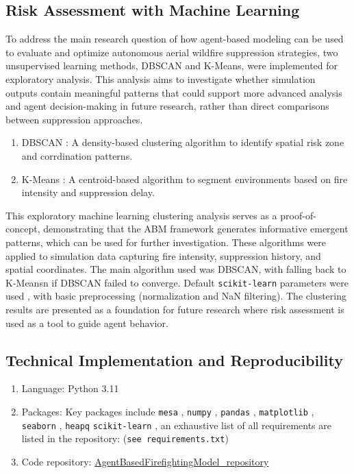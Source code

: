 \documentclass[11pt, a4paper]{article}
\begin{document}
\subsection{Risk Assessment with Machine Learning}

To address the main research question of how agent-based modeling can be used to evaluate and optimize autonomous aerial wildfire suppression strategies, two unsupervised learning methods, DBSCAN and K-Means, were implemented for exploratory analysis. This analysis aims to investigate whether simulation outputs contain meaningful patterns that could support more advanced analysis and agent decision-making in future research, rather than direct comparisons between suppression approaches.
\begin{enumerate}
    \item DBSCAN \citep{dbscan}: A density-based clustering algorithm to identify spatial risk zone and corrdination patterns.
    \item K-Means \citep{kmeans}: A centroid-based algorithm to segment environments based on fire intensity and suppression delay.
\end{enumerate}

This exploratory machine learning clustering analysis serves as a proof-of-concept, demonstrating that the ABM framework generates informative emergent patterns, which can be used for further investigation. These algorithms were applied to simulation data capturing fire intensity, suppression history, and spatial coordinates. The main algorithm used was DBSCAN, with falling back to K-Meansn if DBSCAN failed to converge. Default \texttt{scikit-learn} parameters were used \citep{scikit-learn}, with basic preprocessing (normalization and NaN filtering). The clustering results are presented as a foundation for future research where risk assessment is used as a tool to guide agent behavior. 

\subsection{Technical Implementation and Reproducibility}
\begin{enumerate}
    \item Language: Python 3.11 \citep{python3.11}
    \item Packages: Key packages include \texttt{mesa} \citep{terMesa}, \texttt{numpy} \citep{numpy}, \texttt{pandas} \citep{reback2020pandas}, \texttt{matplotlib} \citep{Matplotlib}, \texttt{seaborn} \citep{seaborn} , \texttt{heapq} \citep{python-heapq} \texttt{scikit-learn} \citep{scikit-learn}, an exhaustive list of all requirements are listed in the repository: (\texttt{see requirements.txt})
    \item Code repository: \href{https://github.com/kaispeidel/thesis}{AgentBasedFirefightingModel\_repository} \citep{AgentBasedFirefightingModel_repository}
\end{enumerate}
\end{document}
